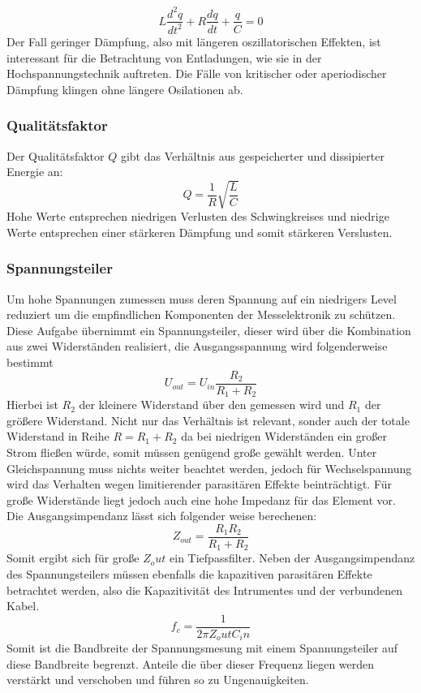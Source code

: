 \begin{equation}
L\frac{d^2q}{dt^2} + R\frac{dq}{dt} + \frac{q}{C} = 0
\end{equation}
Der Fall geringer Dämpfung, also mit längeren oszillatorischen Effekten, ist interessant für die Betrachtung von Entladungen, wie sie in der Hochspannungstechnik auftreten. Die Fälle von kritischer oder aperiodischer Dämpfung klingen ohne längere Osilationen ab.
\subsubsection{Qualitätsfaktor}
Der Qualitätsfaktor \(Q\) gibt das Verhältnis aus gespeicherter und dissipierter Energie an:
\begin{equation}
Q = \frac{1}{R} \sqrt{\frac{L}{C}}
\end{equation}
Hohe Werte entsprechen niedrigen Verlusten des Schwingkreises und niedrige Werte entsprechen einer stärkeren Dämpfung und somit stärkeren Verslusten.

\subsubsection{Spannungsteiler}
\label{sec:voltagedividertheo}
Um hohe Spannungen zumessen muss deren Spannung auf ein niedrigers Level reduziert um die empfindlichen Komponenten der Messelektronik zu schützen. Diese Aufgabe übernimmt ein Spannungsteiler, dieser wird über die Kombination aus zwei Widerständen realisiert, die Ausgangsspannung wird folgenderweise bestimmt
\begin{equation}
    U_{out} = U_{in} \frac{R_2}{R_1 + R_2}
    \label{eq:voltagedivider}
\end{equation}
Hierbei ist \(R_2\) der kleinere Widerstand über den gemessen wird und \(R_1\) der größere Widerstand. Nicht nur das Verhältnis ist relevant, sonder auch der totale Widerstand in Reihe \(R = R_1 + R_2\) da bei niedrigen Widerständen ein großer Strom fließen würde, somit müssen genügend große gewählt werden. Unter Gleichspannung muss nichts weiter beachtet werden, jedoch für Wechselspannung wird das Verhalten wegen limitierender parasitären Effekte beinträchtigt. Für große Widerstände liegt jedoch auch eine hohe Impedanz für das Element vor. Die Ausgangsimpendanz lässt sich folgender weise berechenen:
\begin{equation}
    Z_{out} = \frac{R_1 R_2}{R_1 + R_2}
    \label{eq:voltagedividerimp}
\end{equation}
Somit ergibt sich für große \(Z_out\) ein Tiefpassfilter. Neben der Ausgangsimpendanz des Spannungsteilers müssen ebenfalls die kapazitiven parasitären Effekte betrachtet werden, also die Kapazitivität des Intrumentes und der verbundenen Kabel.
\begin{equation}
    f_c = \frac{1}{2\pi Z_out C_in}
    \label{eq: voltagedividerfreq}
\end{equation}
Somit ist die Bandbreite der Spannungsmesung mit einem Spannungsteiler auf diese Bandbreite begrenzt. Anteile die über dieser Frequenz liegen werden verstärkt und verschoben und führen so zu Ungenauigkeiten. 

